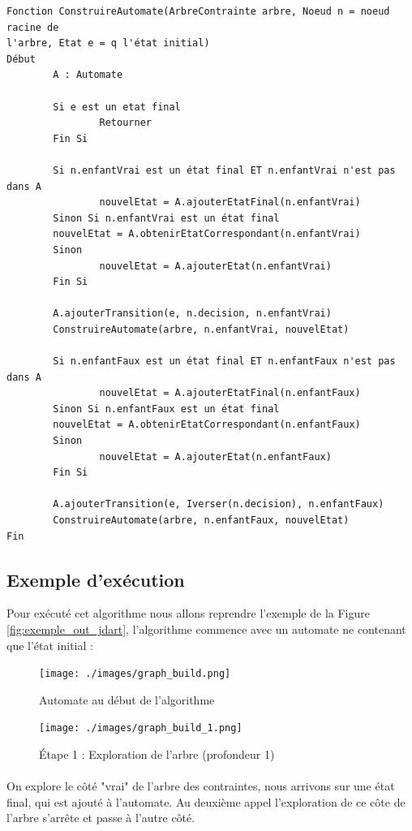 \begin{verbatim}
Fonction ConstruireAutomate(ArbreContrainte arbre, Noeud n = noeud racine de 
l'arbre, Etat e = q l'état initial)
Début
        A : Automate
	
        Si e est un etat final
                Retourner 
        Fin Si
        
        Si n.enfantVrai est un état final ET n.enfantVrai n'est pas dans A
                nouvelEtat = A.ajouterEtatFinal(n.enfantVrai)
        Sinon Si n.enfantVrai est un état final
		nouvelEtat = A.obtenirEtatCorrespondant(n.enfantVrai)
        Sinon
                nouvelEtat = A.ajouterEtat(n.enfantVrai)
        Fin Si
	
        A.ajouterTransition(e, n.decision, n.enfantVrai)
        ConstruireAutomate(arbre, n.enfantVrai, nouvelEtat)

        Si n.enfantFaux est un état final ET n.enfantFaux n'est pas dans A
                nouvelEtat = A.ajouterEtatFinal(n.enfantFaux)
        Sinon Si n.enfantFaux est un état final
		nouvelEtat = A.obtenirEtatCorrespondant(n.enfantFaux)
        Sinon
                nouvelEtat = A.ajouterEtat(n.enfantFaux)
        Fin Si
	
        A.ajouterTransition(e, Iverser(n.decision), n.enfantFaux)
        ConstruireAutomate(arbre, n.enfantFaux, nouvelEtat)
Fin
\end{verbatim}

\subsection{Exemple d'exécution}

Pour exécuté cet algorithme nous allons reprendre l'exemple de la Figure 
\ref{fig:exemple_out_jdart}, l'algorithme commence avec un automate ne 
contenant que l'état initial :

\begin{figure}[H]
 \centering
 \texttt{[image: ./images/graph\_build.png]}
 \caption{Automate au début de l'algorithme}
\end{figure}


 
 \begin{figure}[H]
  \centering
  \texttt{[image: ./images/graph\_build\_1.png]}
  \caption{Étape 1 : Exploration de l'arbre (profondeur 1)}
 \end{figure}

 \paragraph{} On explore le côté "vrai" de l'arbre des contraintes, nous 
arrivons sur une état final, qui est ajouté à l'automate. Au deuxième appel 
l'exploration de ce côte de l'arbre s'arrête et passe à l'autre côté.


